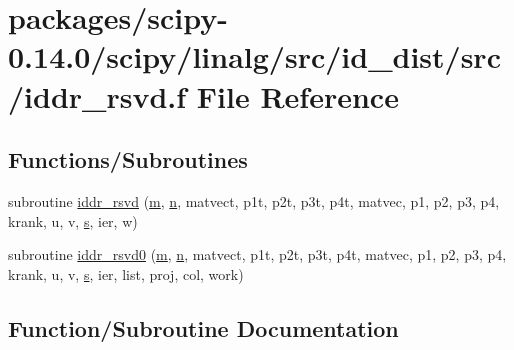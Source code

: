 \hypertarget{iddr__rsvd_8f}{}\section{packages/scipy-\/0.14.0/scipy/linalg/src/id\+\_\+dist/src/iddr\+\_\+rsvd.f File Reference}
\label{iddr__rsvd_8f}
\subsection*{Functions/\+Subroutines}
\begin{DoxyCompactItemize}
\item 
subroutine \hyperlink{iddr__rsvd_8f_aed164fdd083647efd99ae356ea16fd5f}{iddr\+\_\+rsvd} (\hyperlink{indexexpr_8h_ab72fdb4031d47b75ab26dd18a437bcdc}{m}, \hyperlink{indexexpr_8h_ab427e2e2b4d6cec55fa088ea2a692ace}{n}, matvect, p1t, p2t, p3t, p4t, matvec, p1, p2, p3, p4, krank, u, v, \hyperlink{indexexpr_8h_ae024b0db549122b44c349ae28ec990dc}{s}, ier, w)
\item 
subroutine \hyperlink{iddr__rsvd_8f_ae02b113cdf12df6323ed6f624b7f795f}{iddr\+\_\+rsvd0} (\hyperlink{indexexpr_8h_ab72fdb4031d47b75ab26dd18a437bcdc}{m}, \hyperlink{indexexpr_8h_ab427e2e2b4d6cec55fa088ea2a692ace}{n}, matvect, p1t, p2t, p3t, p4t, matvec, p1, p2, p3, p4, krank, u, v, \hyperlink{indexexpr_8h_ae024b0db549122b44c349ae28ec990dc}{s}, ier, list, proj, col, work)
\end{DoxyCompactItemize}


\subsection{Function/\+Subroutine Documentation}
\hypertarget{iddr__rsvd_8f_aed164fdd083647efd99ae356ea16fd5f}{}
